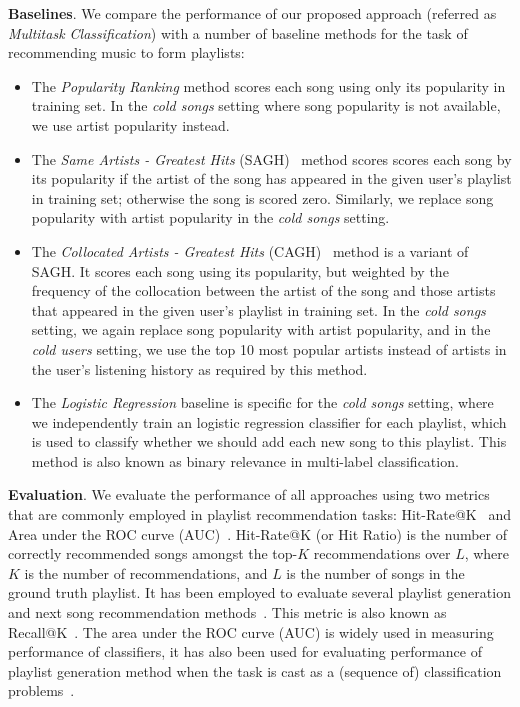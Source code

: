 {\bf Baselines}.
We compare the performance of our proposed approach (referred as {\it Multitask Classification}) 
with a number of baseline methods for the task of recommending music to form playlists:
\begin{itemize}
\item The {\it Popularity Ranking} method scores each song using only its popularity in training set.
      In the \emph{cold songs} setting where song popularity is not available, we use artist popularity instead.
\item The {\it Same Artists - Greatest Hits} (SAGH)~\cite{mcfee2012million} method scores scores each song
      by its popularity if the artist of the song has appeared in the given user's playlist in training set;
      otherwise the song is scored zero.
      Similarly, we replace song popularity with artist popularity in the \emph{cold songs} setting.
\item The {\it Collocated Artists - Greatest Hits} (CAGH)~\cite{bonnin2013evaluating} method is a variant of SAGH.
      It scores each song using its popularity, but weighted by the frequency of the collocation between the artist of the song
      and those artists that appeared in the given user's playlist in training set.
      In the \emph{cold songs} setting, we again replace song popularity with artist popularity,
      and in the \emph{cold users} setting, we use the top 10 most popular artists instead of artists in the user's listening history 
      as required by this method.
\item The {\it Logistic Regression} baseline is specific for the \emph{cold songs} setting, where we independently train
      an logistic regression classifier for each playlist, which is used to classify whether we should add each new song to this playlist.
      This method is also known as binary relevance in multi-label classification.
\end{itemize}


{\bf Evaluation}.
We evaluate the performance of all approaches using two metrics that are commonly employed in playlist recommendation tasks:
Hit-Rate@K~\cite{hariri2012context} and Area under the ROC curve (AUC)~\cite{manning2008introIR}.
%
%
Hit-Rate@K (or Hit Ratio) is the number of correctly recommended songs amongst the top-$K$ recommendations over $L$,
where $K$ is the number of recommendations, and $L$ is the number of songs in the ground truth playlist.
It has been employed to evaluate several playlist generation and next song recommendation
methods~\cite{hariri2012context,bonnin2013evaluating,bonnin2015automated,jannach2015beyond}.
This metric is also known as Recall@K~\cite{schedl2017}.
%
The area under the ROC curve (AUC) is widely used in measuring performance of classifiers,
it has also been used for evaluating performance of playlist generation method when the task
is cast as a (sequence of) classification problems~\cite{ben2017groove}.


